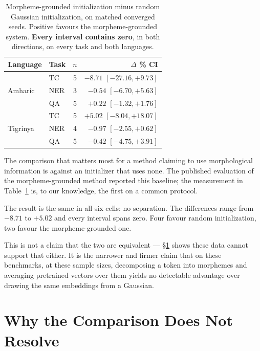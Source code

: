 \documentclass[11pt]{article}
\begin{document}
\begin{table}[t]
\centering
\small
\begin{tabular}{llcr}
\toprule
Language & Task & $n$ & $\Delta$ \quad\quad 95\% CI \\
\midrule
\multirow{3}{*}{Amharic}
 & TC  & 5 & $-8.71$ \quad $[-27.16, +9.73]$ \\
 & NER & 3 & $-0.54$ \quad $[-6.70, +5.63]$ \\
 & QA  & 5 & $+0.22$ \quad $[-1.32, +1.76]$ \\
\midrule
\multirow{3}{*}{Tigrinya}
 & TC  & 5 & $+5.02$ \quad $[-8.04, +18.07]$ \\
 & NER & 4 & $-0.97$ \quad $[-2.55, +0.62]$ \\
 & QA  & 5 & $-0.42$ \quad $[-4.75, +3.91]$ \\
\bottomrule
\end{tabular}
\caption{Morpheme-grounded initialization minus random Gaussian
initialization, on matched converged seeds. Positive favours the
morpheme-grounded system. \textbf{Every interval contains zero}, in both
directions, on every task and both languages.}
\label{tab:floor}
\end{table}

The comparison that matters most for a method claiming to use morphological
information is against an initializer that uses none. The published
evaluation of the morpheme-grounded method reported this baseline; the
measurement in Table~\ref{tab:floor} is, to our knowledge, the first on a
common protocol.

The result is the same in all six cells: no separation. The differences range
from $-8.71$ to $+5.02$ and every interval spans zero. Four favour random
initialization, two favour the morpheme-grounded one.

This is not a claim that the two are equivalent --- \S\ref{sec:resolution}
shows these data cannot support that either. It is the narrower and firmer
claim that on these benchmarks, at these sample sizes, decomposing a token
into morphemes and averaging pretrained vectors over them yields no
detectable advantage over drawing the same embeddings from a Gaussian.

\section{Why the Comparison Does Not Resolve}
\label{sec:resolution}
\end{document}
